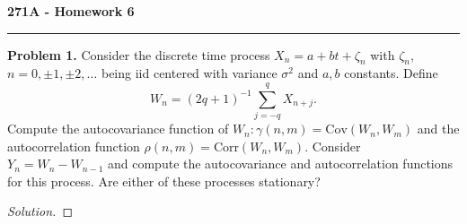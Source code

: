 \documentclass[11pt,letterpaper]{report}
\newcommand{\Cov}{\text{Cov}}
\newcommand{\Corr}{\text{Corr}}
\newenvironment{solution}
{\begin{proof}[Solution]}
{\end{proof}}
\begin{document}
\begin{center}
{\bf \Large 271A - Homework 6}
\vspace{0.2cm}
\hrule
\end{center}

\noindent\textbf{Problem 1. }
Consider the discrete time process $X_n = a+bt+\zeta_n$ with $\zeta_n$, $n = 0, \pm 1, \pm 2, \ldots$ being iid centered with variance $\sigma^2$ and $a,b$ constants. Define
\[
W_n = (2q+1)^{-1}\sum_{j=-q}^qX_{n+j}.
\]
Compute the autocovariance function of $W_n: \gamma(n,m) = \Cov(W_n, W_m)$ and the autocorrelation function $\rho(n,m) = \Corr(W_n, W_m)$. Consider $Y_n = W_n - W_{n-1}$ and compute the autocovariance and autocorrelation functions for this process. Are either of these processes stationary?
\begin{solution}
	
\end{solution}
\end{document}
